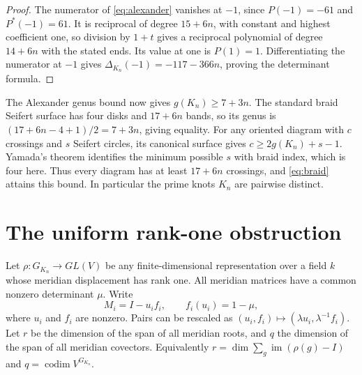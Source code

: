 \documentclass[11pt]{article}
\begin{document}
\begin{proof}
The numerator of \eqref{eq:alexander} vanishes at $-1$, since
$P(-1)=-61$ and $P^*(-1)=61$. It is reciprocal of degree $15+6n$,
with constant and highest coefficient one, so division by $1+t$ gives
a reciprocal polynomial of degree $14+6n$ with the stated ends.
Its value at one is $P(1)=1$. Differentiating the numerator at $-1$
gives $\Delta_{K_n}(-1)=-117-366n$, proving the determinant formula.
\end{proof}

The Alexander genus bound now gives $g(K_n)\ge7+3n$.
The standard braid Seifert surface has four disks and $17+6n$ bands,
so its genus is $(17+6n-4+1)/2=7+3n$, giving equality.
For any oriented diagram with $c$ crossings and $s$ Seifert circles,
its canonical surface gives $c\ge2g(K_n)+s-1$.
Yamada's theorem \cite[Theorem~3, printed p.~347]{yamada} identifies the
minimum possible $s$ with braid index, which is four here. Thus every
diagram has at least $17+6n$ crossings, and \eqref{eq:braid} attains
this bound. In particular the prime knots $K_n$ are pairwise distinct.

\section{The uniform rank-one obstruction}

Let $\rho:G_{K_n}\to GL(V)$ be any finite-dimensional representation
over a field $k$ whose meridian displacement has rank one. All meridian
matrices have a common nonzero determinant $\mu$. Write
\[
 M_i=I-u_if_i,\qquad f_i(u_i)=1-\mu,
\]
where $u_i$ and $f_i$ are nonzero. Pairs can be rescaled as
$(u_i,f_i)\mapsto(\lambda u_i,\lambda^{-1}f_i)$.
Let $r$ be the dimension of the span of all meridian roots, and $q$
the dimension of the span of all meridian covectors. Equivalently
$r=\dim\sum_g\operatorname{im}(\rho(g)-I)$ and
$q=\operatorname{codim}V^{G_{K_n}}$.
\end{document}
